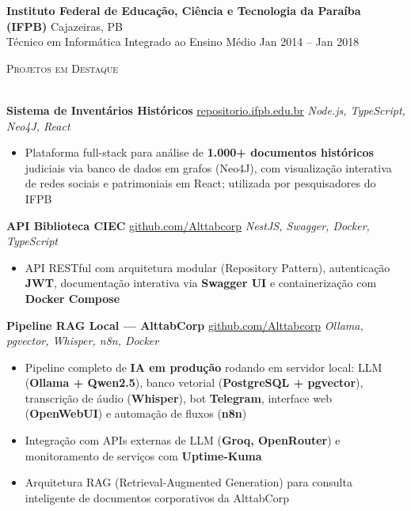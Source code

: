 \documentclass[a4paper]{article}
\newcommand{\lineunder}{
    \vspace*{-8pt} \\
    \hspace*{-18pt} \hrulefill \\
}
\newcommand{\header}[1]{
    {\hspace*{-18pt}\vspace*{6pt} \textsc{#1}}
    \vspace*{-6pt} \lineunder
}
\begin{document}
\textbf{Instituto Federal de Educação, Ciência e Tecnologia da Paraíba (IFPB)} \hfill Cajazeiras, PB\\
Técnico em Informática Integrado ao Ensino Médio \hfill Jan 2014 -- Jan 2018\\

\vspace{3mm}

\header{Projetos em Destaque}
\vspace{2mm}

\textbf{Sistema de Inventários Históricos}
\hfill {\small \href{https://repositorio.ifpb.edu.br/handle/177683/2898}{repositorio.ifpb.edu.br}}
\hfill {\sl Node.js, TypeScript, Neo4J, React}\\
\vspace{-3mm}
\begin{itemize}[leftmargin=*, itemsep=-2pt]
    \item Plataforma full-stack para análise de \textbf{1.000+ documentos históricos} judiciais via banco de dados em grafos (Neo4J), com visualização interativa de redes sociais e patrimoniais em React; utilizada por pesquisadores do IFPB
\end{itemize}
\vspace{2mm}

\textbf{API Biblioteca CIEC}
\hfill {\small \href{https://github.com/Alttabcorp/API-bibliteca_siec}{github.com/Alttabcorp}}
\hfill {\sl NestJS, Swagger, Docker, TypeScript}\\
\vspace{-3mm}
\begin{itemize}[leftmargin=*, itemsep=-2pt]
    \item API RESTful com arquitetura modular (Repository Pattern), autenticação \textbf{JWT}, documentação interativa via \textbf{Swagger UI} e containerização com \textbf{Docker Compose}
\end{itemize}
\vspace{2mm}

\textbf{Pipeline RAG Local — AlttabCorp}
\hfill {\small \href{https://github.com/Alttabcorp}{github.com/Alttabcorp}}
\hfill {\sl Ollama, pgvector, Whisper, n8n, Docker}\\
\vspace{-3mm}
\begin{itemize}[leftmargin=*, itemsep=-2pt]
    \item Pipeline completo de \textbf{IA em produ\c{c}\~{a}o} rodando em servidor local: LLM (\textbf{Ollama + Qwen2.5}), banco vetorial (\textbf{PostgreSQL + pgvector}), transcri\c{c}\~{a}o de \'{a}udio (\textbf{Whisper}), bot \textbf{Telegram}, interface web (\textbf{OpenWebUI}) e automa\c{c}\~{a}o de fluxos (\textbf{n8n})
    \item Integra\c{c}\~{a}o com APIs externas de LLM (\textbf{Groq, OpenRouter}) e monitoramento de servi\c{c}os com \textbf{Uptime-Kuma}
    \item Arquitetura RAG (Retrieval-Augmented Generation) para consulta inteligente de documentos corporativos da AlttabCorp
\end{itemize}
\vspace{2mm}
\end{document}
